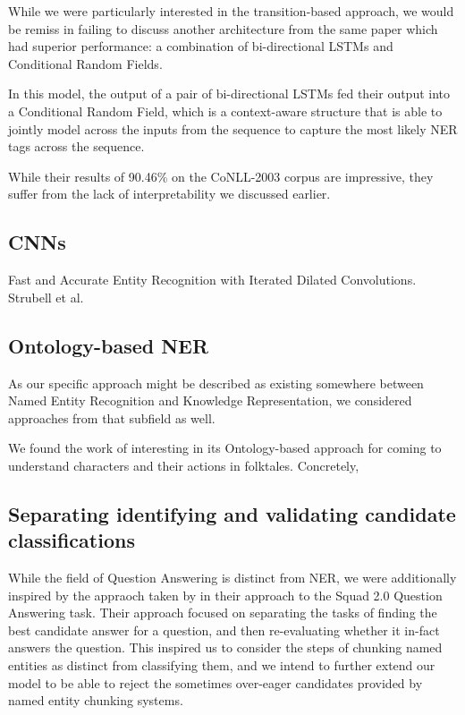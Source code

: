 \documentclass[11pt,a4paper]{article}
\begin{document}
While we were particularly interested in the transition-based approach, we would be remiss in failing to discuss another architecture from the same paper\cite{LampleNeuralArchitecturesNamed2016} which had superior performance: a combination of bi-directional LSTMs and Conditional Random Fields.

In this model, the output of a pair of bi-directional LSTMs fed their output into a Conditional Random Field, which is a context-aware structure that is able to jointly model across the inputs from the sequence to capture the most likely NER tags across the sequence.

While their results of 90.46\% on the CoNLL-2003 corpus are impressive, they suffer from the lack of interpretability we discussed earlier.

\subsection{CNNs}
Fast and Accurate Entity Recognition with Iterated Dilated Convolutions. Strubell et al.

\subsection{Ontology-based NER}
As our specific approach might be described as existing somewhere between Named Entity Recognition and Knowledge Representation, we considered approaches from that subfield as well.

We found the work of \citet{SuciuInterleavingontologybasedreasoning2014} interesting in its Ontology-based approach for coming to understand characters and their actions in folktales. Concretely, 

\subsection{Separating identifying and validating candidate classifications}

While the field of Question Answering is distinct from NER, we were additionally inspired by the appraoch taken by \citet{HuReadVerifyMachine2018} in their approach to the Squad 2.0 Question Answering task. \cite{RajpurkarKnowWhatYou2018} Their approach focused on separating the tasks of finding the best candidate answer for a question, and then re-evaluating whether it in-fact answers the question. This inspired us to consider the steps of chunking named entities as distinct from classifying them, and we intend to further extend our model to be able to reject the sometimes over-eager candidates provided by named entity chunking systems.
\end{document}
